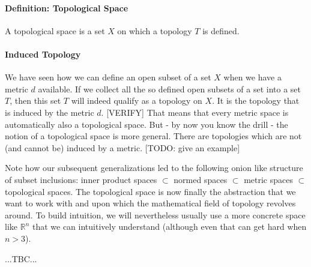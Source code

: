\paragraph{Definition: Topological Space} A topological space is a set $X$ on which a topology $T$ is defined.


\paragraph{Induced Topology} 
We have seen how we can define an open subset of a set $X$ when we have a metric $d$ available. If we collect all the so defined open subsets of a set into a set $T$, then this set $T$ will indeed qualify as a topology on $X$. It is the topology that is induced by the metric $d$. [VERIFY] That means that every metric space is automatically also a topological space. But - by now you know the drill - the notion of a topological space is more general. There are topologies which are not (and cannot be) induced by a metric. [TODO: give an example]


\medskip
Note how our subsequent generalizations led to the following onion like structure of subset inclusions: inner product spaces $\subset$ normed spaces $\subset$ metric spaces $\subset$ topological spaces. The topological space is now finally the abstraction that we want to work with and upon which the mathematical field of topology revolves around. To build intuition, we will nevertheless usually use a more concrete space like $\mathbb{R}^n$ that we can intuitively understand (although even that can get hard when $n > 3$).



...TBC...






